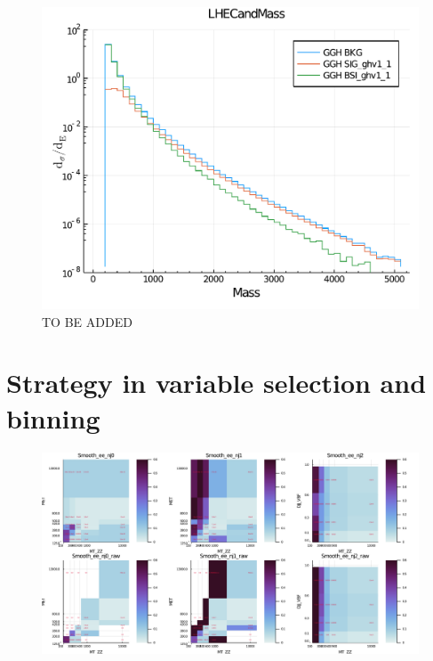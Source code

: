 \begin{figure}[htb]
\begin{center}
\includegraphics[width=.70\linewidth]{fig/LHE_integral_difference.pdf}
\end{center}
\caption{TO BE ADDED}
\label{fig:bsi_sig_bkg_compare}
\end{figure}
\newpage\phantom{blabla}


\section{Strategy in variable selection and binning}
\begin{figure}[htb]
\begin{center}
\includegraphics[width=.90\linewidth]{fig/binning_placeholder.png}
\end{center}
\label{fig:sig_rewgt}
\end{figure}
